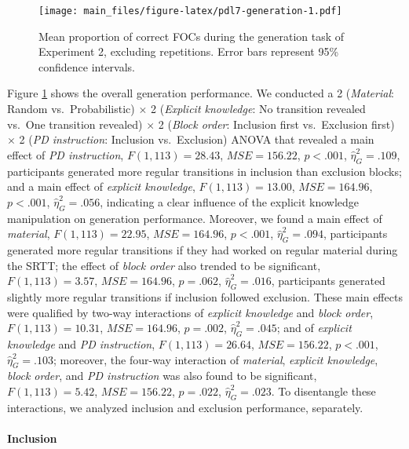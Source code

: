 \documentclass[floatsintext,doc]{apa6}
\theoremstyle{definition}
\theoremstyle{definition}
\theoremstyle{definition}
\theoremstyle{remark}
\begin{document}
\begin{appendix}
\begin{figure}
\centering
\texttt{[image: main\_files/figure-latex/pdl7-generation-1.pdf]}
\caption{\label{fig:pdl7-generation}Mean proportion of correct FOCs during
the generation task of Experiment 2, excluding repetitions. Error bars
represent 95\% confidence intervals.}
\end{figure}

Figure \ref{fig:pdl7-generation} shows the overall generation
performance. We conducted a 2 (\emph{Material}: Random
vs.~Probabilistic) \(\times\) 2 (\emph{Explicit knowledge}: No
transition revealed vs.~One transition revealed) \(\times\) 2
(\emph{Block order}: Inclusion first vs.~Exclusion first) \(\times\) 2
(\emph{PD instruction}: Inclusion vs.~Exclusion) ANOVA that revealed a
main effect of \emph{PD instruction}, \(F(1, 113) = 28.43\),
\(\mathit{MSE} = 156.22\), \(p < .001\), \(\hat{\eta}^2_G = .109\),
participants generated more regular transitions in inclusion than
exclusion blocks; and a main effect of \emph{explicit knowledge},
\(F(1, 113) = 13.00\), \(\mathit{MSE} = 164.96\), \(p < .001\),
\(\hat{\eta}^2_G = .056\), indicating a clear influence of the explicit
knowledge manipulation on generation performance. Moreover, we found a
main effect of \emph{material}, \(F(1, 113) = 22.95\),
\(\mathit{MSE} = 164.96\), \(p < .001\), \(\hat{\eta}^2_G = .094\),
participants generated more regular transitions if they had worked on
regular material during the SRTT; the effect of \emph{block order} also
trended to be significant, \(F(1, 113) = 3.57\),
\(\mathit{MSE} = 164.96\), \(p = .062\), \(\hat{\eta}^2_G = .016\),
participants generated slightly more regular transitions if inclusion
followed exclusion. These main effects were qualified by two-way
interactions of \emph{explicit knowledge} and \emph{block order},
\(F(1, 113) = 10.31\), \(\mathit{MSE} = 164.96\), \(p = .002\),
\(\hat{\eta}^2_G = .045\); and of \emph{explicit knowledge} and \emph{PD
instruction}, \(F(1, 113) = 26.64\), \(\mathit{MSE} = 156.22\),
\(p < .001\), \(\hat{\eta}^2_G = .103\); moreover, the four-way
interaction of \emph{material}, \emph{explicit knowledge}, \emph{block
order}, and \emph{PD instruction} was also found to be significant,
\(F(1, 113) = 5.42\), \(\mathit{MSE} = 156.22\), \(p = .022\),
\(\hat{\eta}^2_G = .023\). To disentangle these interactions, we
analyzed inclusion and exclusion performance, separately.

\paragraph{Inclusion}\label{inclusion}


\end{appendix}
\end{document}
